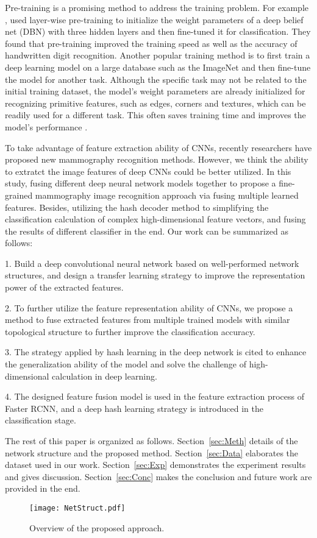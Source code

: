 Pre-training is a promising method to address the 
training problem. For example 
\cite{Hinton2006,Li_2020},
used layer-wise pre-training to initialize the 
weight parameters of a deep belief net (DBN) with 
three hidden layers and then fine-tuned it for 
classification. They found that pre-training 
improved the training speed as well as the 
accuracy of handwritten digit recognition. Another 
popular training method is to first train a deep 
learning model on a large database such as the 
ImageNet 
\cite{Russakovsky2015,9112355}
and then fine-tune the model for another task. 
Although the specific task may not be related to 
the initial training dataset, the model’s weight 
parameters are already initialized for recognizing 
primitive features, such as edges, corners and 
textures, which can be readily used for a different 
task. This often saves training time and improves 
the model’s performance
\cite{He2016,Moreira2018}.

To take advantage of feature extraction ability of 
CNNs, recently researchers have proposed new 
mammography recognition methods. However, we think 
the ability to extratct the image features of 
deep CNNs could be better utilized. In this study, fusing 
different deep neural network models together to 
propose a fine-grained mammography image 
recognition approach via fusing multiple learned
features. Besides, utilizing the hash decoder
method to simplifying the classification 
calculation of complex high-dimensional 
feature vectors, and fusing the results of 
different classifier in the end. Our work can 
be summarized as follows:

1. Build a deep convolutional neural network based 
on well-performed network structures, and design a 
transfer learning strategy to improve the 
representation power of the extracted features.


2. To further utilize the feature representation 
ability of CNNs, we propose a method to fuse 
extracted features from multiple trained models 
with similar topological structure to
further improve the classification accuracy.

3. The strategy applied by hash learning in the 
deep network is cited to enhance the 
generalization ability of the model and solve the 
challenge of high-dimensional calculation 
in deep learning.

4. The designed feature fusion model is used in 
the feature extraction process of Faster RCNN, 
and a deep hash learning strategy is introduced 
in the classification stage.

The rest of this paper is organized as follows. 
Section~\ref{sec:Meth} 
details of the network structure and the proposed 
method. 
Section~\ref{sec:Data} 
elaborates the dataset used in our work.
Section~\ref{sec:Exp} 
demonstrates the experiment results and gives 
discussion. 
Section~\ref{sec:Conc} 
makes the conclusion and future work are provided 
in the end.

\begin{figure*}[!ht]
    \centering
    \texttt{[image: NetStruct.pdf]}
    \caption{Overview of the proposed approach.}
    \label{fig:netStruct}
\end{figure*}
